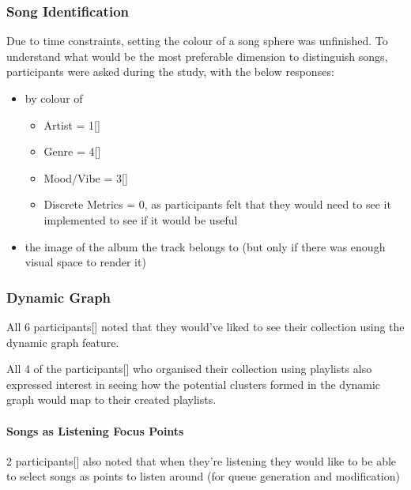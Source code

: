 \subsubsection{Song Identification}
Due to time constraints, setting the colour of a song sphere was unfinished. To understand what would be the most preferable dimension to distinguish songs, participants were asked during the study, with the below responses:\begin{itemize}
    \item by colour of\begin{itemize}
        \item Artist = 1[]
        \item Genre = 4[]
        \item Mood/Vibe = 3[]
        \item Discrete Metrics = 0, as participants felt that they would need to see it implemented to see if it would be useful
    \end{itemize}
    \item the image of the album the track belongs to (but only if there was enough visual space to render it)
\end{itemize}

\subsubsection{Dynamic Graph}
All 6 participants[] noted that they would've liked to see their collection using the dynamic graph feature.

All 4 of the participants[] who organised their collection using playlists also expressed interest in seeing how the potential clusters formed in the dynamic graph would map to their created playlists.

\paragraph{Songs as Listening Focus Points}
2 participants[] also noted that when they're listening they would like to be able to select songs as points to listen around (for queue generation and modification)
